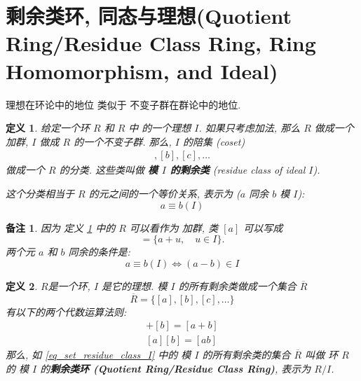 \documentclass[utf8]{ctexbook}
\newtheorem{definition}{定义}[section]
\newtheorem{memo}{备注}[section]
\begin{document}
\section{剩余类环, 同态与理想(Quotient Ring/Residue Class Ring, Ring Homomorphism, and Ideal)}

理想在环论中的地位 类似于 不变子群在群论中的地位.

\begin{definition}\label{def_residue_class_ideal}
给定一个环 $R$ 和 $R$ 中 的一个理想 $I$. 如果只考虑加法, 那么 $R$ 做成一个加群, $I$ 做成 $R$ 的一个不变子群. 那么, $I$ 的陪集 (coset)
\begin{align*}
[a], [b], [c], \ldots
\end{align*}
做成一个 $R$ 的分类. 这些类叫做 \textbf{模 $I$ 的剩余类} (residue class of ideal $I$).

这个分类相当于 $R$ 的元之间的一个等价关系, 表示为 ($a$ 同余 $b$ 模 $I$):
\begin{equation}
a \equiv b(I) \nonumber
\end{equation}
\end{definition}

\begin{memo}
因为 定义 \ref{def_residue_class_ideal} 中的 $R$ 可以看作为 加群, 类 $[a]$ 可以写成
\begin{equation}
[a] = \{ a + u , \quad u \in I \} . \nonumber
\end{equation}
两个元 $a$ 和 $b$ 同余的条件是:
\begin{equation}
a \equiv b (I) \iff (a-b) \in I \nonumber
\end{equation}

\end{memo}

\begin{definition}\label{def_quotient_ring_set}
$R$是一个环, $I$ 是它的理想. 模 $I$ 的所有剩余类做成一个集合 $\overline{R}$
\begin{equation}
\overline{R} = \{ [a], [b], [c], \ldots \} \label{eq_set_residue_class_I}
\end{equation}
有以下的两个代数运算法则:
\begin{align*}
[a] +[b] = [a+b] \\
[a][b] = [ab]
\end{align*}
那么, 如 \ref{eq_set_residue_class_I} 中的 模 $I$ 的所有剩余类的集合 $\overline{R}$ 叫做 环 $R$ 的 模 $I$ 的\textbf{剩余类环 (Quotient Ring/Residue Class Ring)}, 表示为 $R/I$.
\end{definition}
\end{document}
